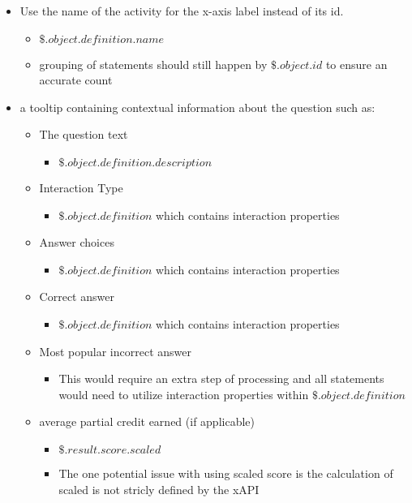 \documentclass{article}
\begin{document}
\begin{itemize}
\item Use the name of the activity for the x-axis label instead of
  its id.
  \begin{itemize}
  \item $\$.object.definition.name$
  \item grouping of statements should still happen by
    $\$.object.id$ to ensure an accurate count
  \end{itemize}
\item a tooltip containing contextual information about the question
  such as:
  \begin{itemize}
  \item The question text
    \begin{itemize}
    \item $\$.object.definition.description$
    \end{itemize}
  \item Interaction Type
    \begin{itemize}
    \item $\$.object.definition$ which contains interaction properties
    \end{itemize}
  \item Answer choices
    \begin{itemize}
    \item $\$.object.definition$ which contains interaction properties
    \end{itemize}
  \item Correct answer
    \begin{itemize}
    \item $\$.object.definition$ which contains interaction properties
    \end{itemize}
  \item Most popular incorrect answer
    \begin{itemize}
    \item This would require an extra step of processing and all
      statements would need to utilize interaction properties within
      $\$.object.definition$
    \end{itemize}
  \item average partial credit earned (if applicable)
    \begin{itemize}
    \item $\$.result.score.scaled$
    \item The one potential issue with using scaled score is the
      calculation of scaled is not stricly defined by the xAPI

\end{itemize}
\end{itemize}
\end{itemize}
\end{document}
